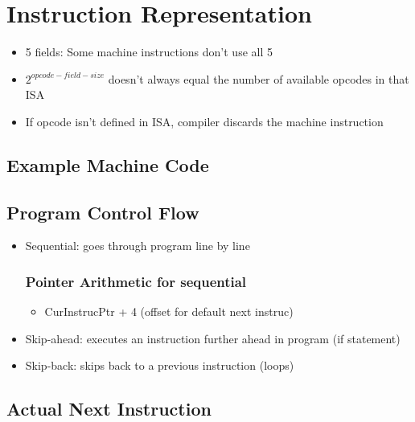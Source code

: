 \documentclass{article}
\begin{document}
\section{Instruction Representation}
    
    \begin{itemize}
        \item 5 fields: Some machine instructions don't use all 5
        
        
        \item $2^{opcode-field-size}$ doesn't always equal the number of available opcodes in that ISA
        
        \item If opcode isn't defined in ISA, compiler discards the machine instruction
        
    \end{itemize}
    
    \subsection{Example Machine Code}
    

    \subsection{Program Control Flow}
    
    \begin{itemize}
        \item Sequential: goes through program line by line
        
        \subsubsection{Pointer Arithmetic for sequential}
        
        \begin{itemize}
            \item CurInstrucPtr + 4 (offset for default next instruc)
        \end{itemize}
            
        
        \item Skip-ahead: executes an instruction further ahead in program (if statement)
        
        \item Skip-back: skips back to a previous instruction (loops)
    \end{itemize}
 
 \subsection{Actual Next Instruction}
 
\end{document}
